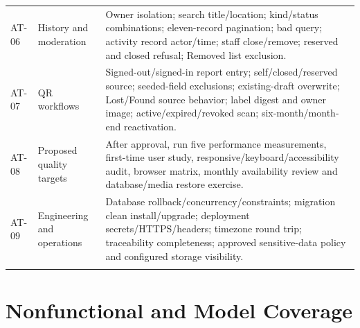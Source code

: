 \documentclass[12pt,a4paper,oneside]{report}
\begin{document}
\begin{longtable}{@{}P{0.11\dimexpr\textwidth-24pt\relax}P{0.22\dimexpr\textwidth-24pt\relax}P{0.67\dimexpr\textwidth-24pt\relax}@{}}
AT-06 & History and moderation & Owner isolation; search title/location; kind/status combinations; eleven-record pagination; bad query; activity record actor/time; staff close/remove; reserved and closed refusal; Removed list exclusion. \\ \addlinespace[3pt]

AT-07 & QR workflows & Signed-out/signed-in report entry; self/closed/reserved source; seeded-field exclusions; existing-draft overwrite; Lost/Found source behavior; label digest and owner image; active/expired/revoked scan; six-month/month-end reactivation. \\ \addlinespace[3pt]

AT-08 & Proposed quality targets & After approval, run five performance measurements, first-time user study, responsive/keyboard/accessibility audit, browser matrix, monthly availability review and database/media restore exercise. \\ \addlinespace[3pt]

AT-09 & Engineering and operations & Database rollback/concurrency/constraints; migration clean install/upgrade; deployment secrets/HTTPS/headers; timezone round trip; traceability completeness; approved sensitive-data policy and configured storage visibility. \\ \addlinespace[3pt]

\end{longtable}


\section{Nonfunctional and Model Coverage}
\end{document}
